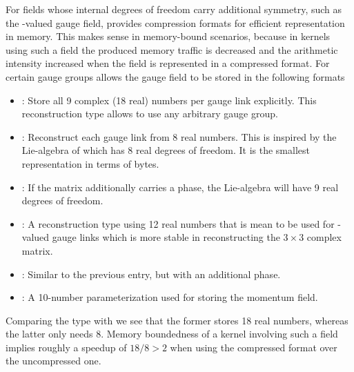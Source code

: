 For fields whose internal degrees of freedom carry additional symmetry, such as the -valued gauge field, \quda provides compression formats for efficient representation in memory.
This makes sense in memory-bound scenarios, because in kernels using such a field the produced memory traffic is decreased and the arithmetic intensity increased when the field is represented in a compressed format.
For certain gauge groups \quda allows the gauge field to be stored in the following formats
\begin{itemize}
  \item {}: Store all \num{9} complex (\num{18} real) numbers per gauge link explicitly. This reconstruction type allows to use any arbitrary gauge group.
  \item {}: Reconstruct each gauge link from \num{8} real numbers. This is inspired by the Lie-algebra of  which has \num{8} real degrees of freedom. It is the smallest representation in terms of bytes.
  \item {}: If the  matrix additionally carries a  phase, the Lie-algebra will have \num{9} real degrees of freedom.
  \item {}: A reconstruction type using \num{12} real numbers that is mean to be used for -valued gauge links which is more stable in reconstructing the $3 \times 3$ complex matrix.
  \item {}: Similar to the previous entry, but with an additional  phase.
  \item {}: A \num{10}-number parameterization used for storing the momentum field.
\end{itemize}
Comparing the  type with  we see that the former stores \num{18} real numbers, whereas the latter only needs \num{8}. Memory boundedness of a kernel involving such a field implies roughly a speedup of $18/8 > 2$ when using the compressed format over the uncompressed one.


